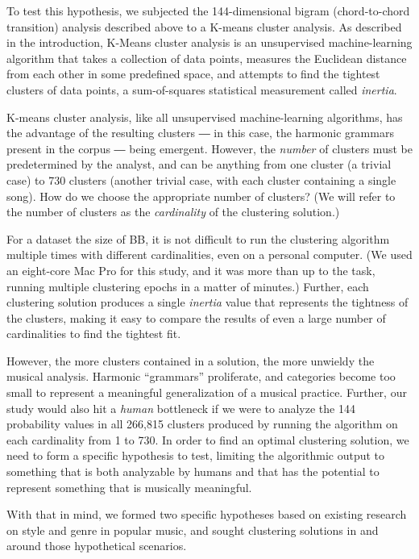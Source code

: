 To test this hypothesis, we subjected the 144-dimensional bigram (chord-to-chord transition) analysis described above to a K-means cluster analysis. As described in the introduction, K-Means cluster analysis is an unsupervised machine-learning algorithm that takes a collection of data points, measures the Euclidean distance from each other in some predefined space, and attempts to find the tightest clusters of data points, a sum-of-squares statistical measurement called \emph{inertia}.

K-means cluster analysis, like all unsupervised machine-learning algorithms, has the advantage of the resulting clusters ― in this case, the harmonic grammars present in the corpus ― being emergent. However, the \emph{number} of clusters must be predetermined by the analyst, and can be anything from one cluster (a trivial case) to 730 clusters (another trivial case, with each cluster containing a single song). How do we choose the appropriate number of clusters? (We will refer to the number of clusters as the \emph{cardinality} of the clustering solution.)

For a dataset the size of BB, it is not difficult to run the clustering algorithm multiple times with different cardinalities, even on a personal computer. (We used an eight-core Mac Pro for this study, and it was more than up to the task, running multiple clustering epochs in a matter of minutes.) Further, each clustering solution produces a single \emph{inertia} value that represents the tightness of the clusters, making it easy to compare the results of even a large number of cardinalities to find the tightest fit.

However, the more clusters contained in a solution, the more unwieldy the musical analysis. Harmonic ``grammars'' proliferate, and categories become too small to represent a meaningful generalization of a musical practice. Further, our study would also hit a \emph{human} bottleneck if we were to analyze the 144 probability values in all 266,815 clusters produced by running the algorithm on each cardinality from 1 to 730. In order to find an optimal clustering solution, we need to form a specific hypothesis to test, limiting the algorithmic output to something that is both analyzable by humans and that has the potential to represent something that is musically meaningful.

With that in mind, we formed two specific hypotheses based on existing research on style and genre in popular music, and sought clustering solutions in and around those hypothetical scenarios.

